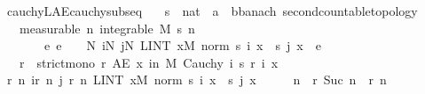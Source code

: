 \begin{isabellebody}
\begin{isamarkuptext}
\end{isamarkuptext}\isamarkuptrue%
\isamarkupfalse%
\ cauchy{\isacharunderscore}{\kern0pt}L{}{\isacharunderscore}{\kern0pt}AE{\isacharunderscore}{\kern0pt}cauchy{\isacharunderscore}{\kern0pt}subseq{\isacharcolon}{\kern0pt}\isanewline
\ \ \ s\ {\isacharcolon}{\kern0pt}{\isacharcolon}{\kern0pt}\ {\isachardoublequoteopen}nat\ {\isasymRightarrow}\ {\isacharprime}{\kern0pt}a\ {\isasymRightarrow}\ {\isacharprime}{\kern0pt}b{\isacharcolon}{\kern0pt}{\isacharcolon}{\kern0pt}{\isacharbraceleft}{\kern0pt}banach{\isacharcomma}{\kern0pt}\ second{\isacharunderscore}{\kern0pt}countable{\isacharunderscore}{\kern0pt}topology{\isacharbraceright}{\kern0pt}{\isachardoublequoteclose}\isanewline
\ \ \ {\isacharbrackleft}{\kern0pt}measurable{\isacharbrackright}{\kern0pt}{\isacharcolon}{\kern0pt}\ {\isachardoublequoteopen}{\isasymAnd}n{\isachardot}{\kern0pt}\ integrable\ M\ {\isacharparenleft}{\kern0pt}s\ n{\isacharparenright}{\kern0pt}{\isachardoublequoteclose}\isanewline
\ \ \ \ \ \ \ {\isachardoublequoteopen}{\isasymAnd}e{\isachardot}{\kern0pt}\ e\ {\isachargreater}{\kern0pt}\ {}\ {\isasymLongrightarrow}\ {\isasymexists}N{\isachardot}{\kern0pt}\ {\isasymforall}i{\isasymge}N{\isachardot}{\kern0pt}\ {\isasymforall}j{\isasymge}N{\isachardot}{\kern0pt}\ LINT\ x{\isacharbar}{\kern0pt}M{\isachardot}{\kern0pt}\ norm\ {\isacharparenleft}{\kern0pt}s\ i\ x\ {\isacharminus}{\kern0pt}\ s\ j\ x{\isacharparenright}{\kern0pt}\ {\isacharless}{\kern0pt}\ e{\isachardoublequoteclose}\isanewline
\ \ \ r\ \ {\isachardoublequoteopen}strict{\isacharunderscore}{\kern0pt}mono\ r{\isachardoublequoteclose}\ {\isachardoublequoteopen}AE\ x\ in\ M{\isachardot}{\kern0pt}\ Cauchy\ {\isacharparenleft}{\kern0pt}{\isasymlambda}i{\isachardot}{\kern0pt}\ s\ {\isacharparenleft}{\kern0pt}r\ i{\isacharparenright}{\kern0pt}\ x{\isacharparenright}{\kern0pt}{\isachardoublequoteclose}\isanewline
%
\isadelimproof
%
\endisadelimproof
%
\isatagproof
{}\isamarkupfalse%
{\isacharminus}{\kern0pt}\isanewline
\ \ \isamarkupfalse%
\ {\isachardoublequoteopen}{\isasymexists}r{\isachardot}{\kern0pt}\ {\isasymforall}n{\isachardot}{\kern0pt}\ {\isacharparenleft}{\kern0pt}{\isasymforall}i{\isasymge}r\ n{\isachardot}{\kern0pt}\ {\isasymforall}j{\isasymge}\ r\ n{\isachardot}{\kern0pt}\ LINT\ x{\isacharbar}{\kern0pt}M{\isachardot}{\kern0pt}\ norm\ {\isacharparenleft}{\kern0pt}s\ i\ x\ {\isacharminus}{\kern0pt}\ s\ j\ x{\isacharparenright}{\kern0pt}\ {\isacharless}{\kern0pt}\ {\isacharparenleft}{\kern0pt}{}\ {\isacharslash}{\kern0pt}\ {}{\isacharparenright}{\kern0pt}\ {\isacharcircum}{\kern0pt}\ n{\isacharparenright}{\kern0pt}\ {\isasymand}\ {\isacharparenleft}{\kern0pt}r\ {\isacharparenleft}{\kern0pt}Suc\ n{\isacharparenright}{\kern0pt}\ {\isachargreater}{\kern0pt}\ r\ n{\isacharparenright}{\kern0pt}{\isachardoublequoteclose}\isanewline

\end{isabellebody}
